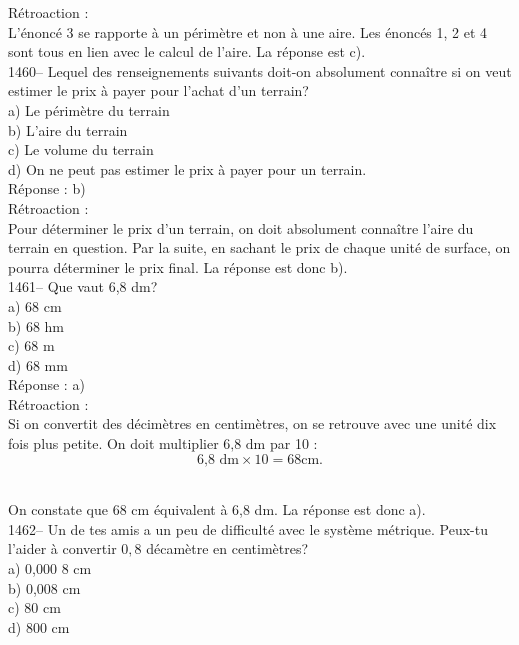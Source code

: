 R\'etroaction :\\
L'\'enonc\'e 3 se rapporte \`a  un p\'erim\`etre et non \`a une
aire. Les
\'enonc\'es 1, 2 et 4 sont tous en lien avec le calcul de l'aire. La
r\'eponse est c).\\

1460-- Lequel des renseignements suivants doit-on absolument
conna\^itre si on
veut estimer le prix \`a payer pour l'achat d'un terrain?\\
a) Le p\'erim\`etre du terrain\\
b) L'aire du terrain\\
c) Le volume du terrain\\
d) On ne peut pas estimer le prix \`a payer pour un terrain.\\

R\'eponse : b)\\

R\'etroaction :\\
Pour d\'eterminer le prix d'un terrain, on doit absolument
conna\^itre l'aire du terrain en question. Par la suite, en sachant
le prix de chaque unit\'e de surface, on pourra d\'eterminer le prix final.
La r\'eponse est donc b).\\

1461-- Que vaut 6,8 dm? \\
a) 68 cm\\
b) 68 hm\\
c) 68 m\\
d) 68 mm \\

R\'eponse : a)\\

R\'etroaction :\\
Si on convertit des d\'ecim\`etres en centim\`etres, on se retrouve
avec une unit\'e dix fois plus petite. On doit multiplier
${\textrm{6,8 dm}}$ par 10 :$${\textrm{6,8 dm}}\times10=68 {\textrm{
cm}}.$$ \

On constate que 68 cm \'equivalent \`a 6,8 dm. La r\'eponse est donc a).\\

1462-- Un de tes amis a un peu de difficult\'e avec le syst\`eme
m\'etrique. Peux-tu l'aider \`a convertir $0,8$ d\'ecam\`etre en
centim\`etres?\\
a) 0,000 8 cm\\
b) 0,008 cm\\
c) 80 cm\\
d) 800 cm\\

